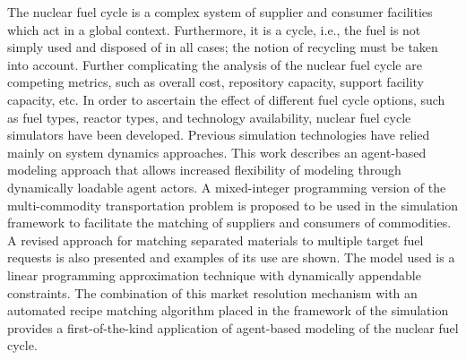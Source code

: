 
The nuclear fuel cycle is a complex system of supplier and consumer facilities
which act in a global context. Furthermore, it is a cycle, i.e., the fuel is not
simply used and disposed of in all cases; the notion of recycling must be taken
into account. Further complicating the analysis of the nuclear fuel cycle are
competing metrics, such as overall cost, repository capacity, support facility
capacity, etc. In order to ascertain the effect of different fuel cycle options,
such as fuel types, reactor types, and technology availability, nuclear fuel
cycle simulators have been developed. Previous simulation technologies have
relied mainly on system dynamics approaches. This work describes an agent-based
modeling approach that allows increased flexibility of modeling through
dynamically loadable agent actors. A mixed-integer programming version of the
multi-commodity transportation problem is proposed to be used in the simulation
framework to facilitate the matching of suppliers and consumers of
commodities. A revised approach for matching separated materials to multiple
target fuel requests is also presented and examples of its use are shown. The
model used is a linear programming approximation technique with dynamically
appendable constraints. The combination of this market resolution mechanism with
an automated recipe matching algorithm placed in the framework of the \Cyclus
simulation provides a first-of-the-kind application of agent-based modeling of
the nuclear fuel cycle.

